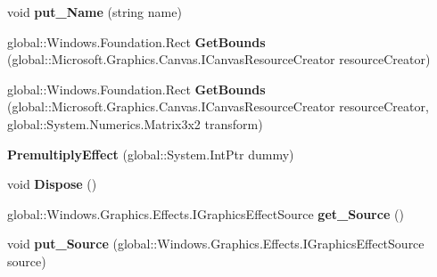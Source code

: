 \begin{DoxyCompactItemize}
void {\bfseries put\+\_\+\+Name} (string name)
\item 
\mbox{\label{class_microsoft_1_1_graphics_1_1_canvas_1_1_effects_1_1_premultiply_effect_a47fdc5928f2f49a98c50255a72422ff2}} 
global\+::\+Windows.\+Foundation.\+Rect {\bfseries Get\+Bounds} (global\+::\+Microsoft.\+Graphics.\+Canvas.\+I\+Canvas\+Resource\+Creator resource\+Creator)
\item 
\mbox{\label{class_microsoft_1_1_graphics_1_1_canvas_1_1_effects_1_1_premultiply_effect_a947b24f370b9b36c3b160ab2faa72fcd}} 
global\+::\+Windows.\+Foundation.\+Rect {\bfseries Get\+Bounds} (global\+::\+Microsoft.\+Graphics.\+Canvas.\+I\+Canvas\+Resource\+Creator resource\+Creator, global\+::\+System.\+Numerics.\+Matrix3x2 transform)
\item 
\mbox{\label{class_microsoft_1_1_graphics_1_1_canvas_1_1_effects_1_1_premultiply_effect_a8186cf7bd26fe373a3ab0216db4f0f3a}} 
{\bfseries Premultiply\+Effect} (global\+::\+System.\+Int\+Ptr dummy)
\item 
\mbox{\label{class_microsoft_1_1_graphics_1_1_canvas_1_1_effects_1_1_premultiply_effect_a5fc45f472f6b09a3d1441141d658dbce}} 
void {\bfseries Dispose} ()
\item 
\mbox{\label{class_microsoft_1_1_graphics_1_1_canvas_1_1_effects_1_1_premultiply_effect_a8c8c30dc5766fa4177f8eae0c877a43b}} 
global\+::\+Windows.\+Graphics.\+Effects.\+I\+Graphics\+Effect\+Source {\bfseries get\+\_\+\+Source} ()
\item 
\mbox{\label{class_microsoft_1_1_graphics_1_1_canvas_1_1_effects_1_1_premultiply_effect_a26d18606e78cafec090c0e8e592ebf37}} 
void {\bfseries put\+\_\+\+Source} (global\+::\+Windows.\+Graphics.\+Effects.\+I\+Graphics\+Effect\+Source source)
\item 
\mbox{\label{class_microsoft_1_1_graphics_1_1_canvas_1_1_effects_1_1_premultiply_effect_a0ec84e32cb7178d2686048d1ea442275}} 

\end{DoxyCompactItemize}
